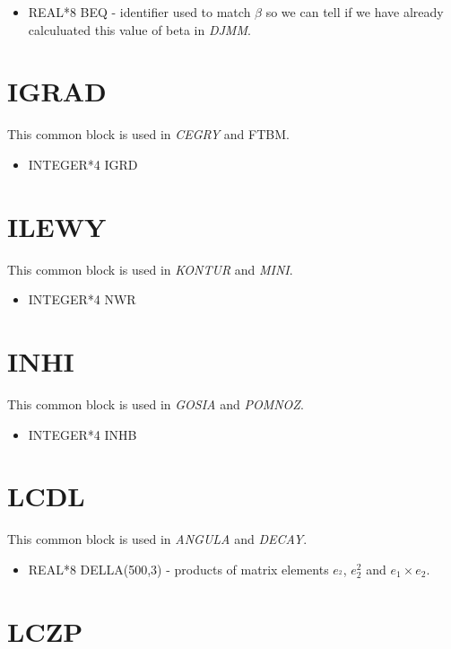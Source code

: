 \begin{itemize}
\item REAL*8 BEQ - identifier used to match $\beta$ so we can tell if we
have already calculuated this value of beta in {\em DJMM}.
\end{itemize}

\section{IGRAD}

This common block is used in {\em CEGRY} and {FTBM}.

\begin{itemize}
\item INTEGER*4 IGRD
\end{itemize}

\section{ILEWY}

This common block is used in {\em KONTUR} and {\em MINI}.

\begin{itemize}
\item INTEGER*4 NWR
\end{itemize}

\section{INHI}

This common block is used in {\em GOSIA} and {\em POMNOZ}.

\begin{itemize}
\item INTEGER*4 INHB
\end{itemize}


\section{LCDL}

This common block is used in {\em ANGULA} and {\em DECAY}.

\begin{itemize}
\item REAL*8 DELLA(500,3) - products of matrix elements $e_^2$, $e_2^2$ and
$e_1 \times e_2$.
\end{itemize}

\section{LCZP}

